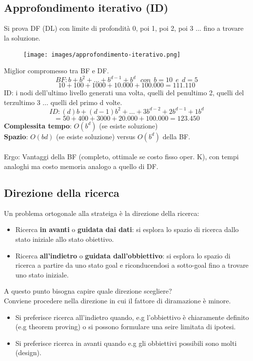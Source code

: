 \subsection{Approfondimento iterativo (ID)}
Si prova DF (DL) con limite di profondità 0, poi 1, poi 2, poi 3 ... fino
a trovare la soluzione.
\begin{figure}[h!]
	\centering
	\texttt{[image: images/approfondimento-iterativo.png]}
\end{figure}

\hspace{-15pt}Miglior compromesso tra BF e DF.
$$BF: b + b^2 + \dots + b^{d-1} + b^d \:\:\: con\:\: b=10\:\: e\:\: d=5$$
$$10 + 100 + 1000 + 10.000 + 100.000 = 111.110$$
ID: i nodi dell'ultimo livello generati una volta, quelli del penultimo 2, quelli
del terzultimo 3 ... quelli del primo d volte.
$$ID: (d)b + (d-1)b^2 + \dots + 3b^{d-2} + 2b^{d-1} + 1b^d$$
$$= 50 + 400 + 3000 + 20.000 + 100.000 = 123.450$$
\textbf{Complessita tempo}: $O(b^d)$ (se esiste soluzione)\\
\textbf{Spazio}: $O(bd)$ (se esiste soluzione) versus $O(b^d)$ della BF.\\\\
Ergo: Vantaggi della BF (completo, ottimale se costo fisso oper. K),
con tempi analoghi ma costo memoria analogo a quello di DF.

\subsection{Direzione della ricerca}
Un problema ortogonale alla strateiga è la direzione della ricerca:
\begin{itemize}
	\item Ricerca \textbf{in avanti} o \textbf{guidata dai dati}: si esplora lo spazio di ricerca dallo stato iniziale allo stato obiettivo.
	\item Ricerca \textbf{all'indietro} o \textbf{guidata dall'obbiettivo}: si esplora lo spazio di ricerca a partire da uno stato goal e riconducendosi a sotto-goal fino a trovare uno stato iniziale. 
\end{itemize}
A questo punto bisogna capire quale direzione scegliere?\\
Conviene procedere nella direzione in cui il fattore di diramazione è minore.
\begin{itemize}
	\item Si preferisce ricerca all'indietro quando, e.g l'obbiettivo è chiaramente definito (e.g theorem proving) o si possono formulare una seire limitata di ipotesi.
	\item Si preferisce ricerca in avanti quando e.g gli obbiettivi possibili sono molti (design).
\end{itemize}
